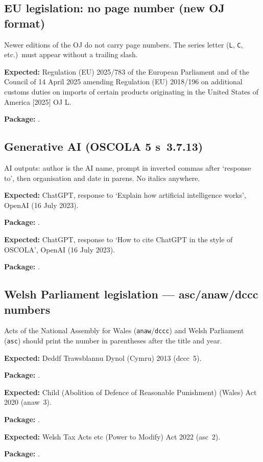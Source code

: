 \documentclass[12pt]{article}
\newcommand{\expected}[1]{\par\textbf{Expected:} #1}
\newcommand{\pkg}{\par\textbf{Package:} }
\begin{document}
\subsection{EU legislation: no page number (new OJ format)}

Newer editions of the OJ do not carry page numbers.  The series letter
(\texttt{L}, \texttt{C}, etc.)\ must appear without a trailing slash.

\expected{%
  Regulation (EU) 2025/783 of the European Parliament and of the Council
  of 14 April 2025 amending Regulation (EU) 2018/196 on additional customs
  duties on imports of certain products originating in the United States of
  America [2025] OJ L.%
}

\pkg
\cite{eu2025:tariffs}.

\subsection{Generative AI (OSCOLA 5 s~3.7.13)}

AI outputs: author is the AI name, prompt in inverted commas after
`response to', then organisation and date in parens.  No italics anywhere.

\expected{%
  ChatGPT, response to `Explain how artificial intelligence works',
  OpenAI (16 July 2023).%
}

\pkg
\cite{chatgpt:ai23a}.

\expected{%
  ChatGPT, response to `How to cite ChatGPT in the style of OSCOLA',
  OpenAI (16 July 2023).%
}

\pkg
\cite{chatgpt:ai23b}.

\subsection{Welsh Parliament legislation — asc/anaw/dccc numbers}

Acts of the National Assembly for Wales (\texttt{anaw}/\texttt{dccc})
and Welsh Parliament (\texttt{asc}) should print the number in
parentheses after the title and year.

\expected{%
  Deddf Trawsblannu Dynol (Cymru) 2013 (dccc~5).%
}

\pkg
\cite{transplantation13}.

\expected{%
  Child (Abolition of Defence of Reasonable Punishment) (Wales) Act 2020
  (anaw~3).%
}

\pkg
\cite{abolition20}.

\expected{%
  Welsh Tax Acts etc (Power to Modify) Act 2022 (asc~2).%
}

\pkg
\cite{welshtax22}.


\printbibliography
\end{document}
